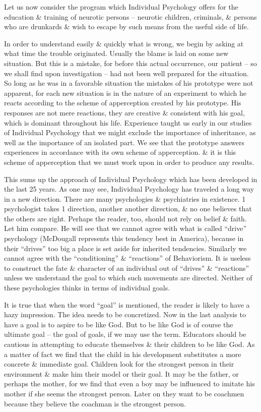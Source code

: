 \documentclass{article}
\begin{document}
Let us now consider the program which Individual Psychology offers for the education \& training of neurotic persons -- neurotic children, criminals, \& persons who are drunkards \& wish to escape by such means from the useful side of life.

In order to understand easily \& quickly what is wrong, we begin by asking at what time the trouble originated. Usually the blame is laid on some new situation. But this is a mistake, for before this actual occurrence, our patient -- so we shall find upon investigation -- had not been well prepared for the situation. So long as he was in a favorable situation the mistakes of his prototype were not apparent, for each new situation is in the nature of an experiment to which he reacts according to the scheme of apperception created by his prototype. His responses are not mere reactions, they are creative \& consistent with his goal, which is dominant throughout his life. Experience taught us early in our studies of Individual Psychology that we might exclude the importance of inheritance, as well as the importance of an isolated part. We see that the prototype answers experiences in accordance with its own scheme of apperception. \& it is this scheme of apperception that we must work upon in order to produce any results.

This sums up the approach of Individual Psychology which has been developed in the last 25 years. As one may see, Individual Psychology has traveled a long way in a new direction. There are many psychologies \& psychiatries in existence. 1 psychologist takes 1 direction, another another direction, \& no one believes that the others are right. Perhaps the reader, too, should not rely on belief \& faith. Let him compare. He will see that we cannot agree with what is called ``drive'' psychology (McDougall represents this tendency best in America), because in their ``drives'' too big a place is set aside for inherited tendencies. Similarly we cannot agree with the ``conditioning'' \& ``reactions'' of Behaviorism. It is useless to construct the fate \& character of an individual out of ``drives'' \& ``reactions'' unless we understand the goal to which such movements are directed. Neither of these psychologies thinks in terms of individual goals.

It is true that when the word ``goal'' is mentioned, the reader is likely to have a hazy impression. The idea needs to be concretized. Now in the last analysis to have a goal is to aspire to be like God. But to be like God is of course the ultimate goal -- the goal of goals, if we may use the term. Educators should be cautious in attempting to educate themselves \& their children to be like God. As a matter of fact we find that the child in his development substitutes a more concrete \& immediate goal. Children look for the strongest person in their environment \& make him their model or their goal. It may be the father, or perhaps the mother, for we find that even a boy may be influenced to imitate his mother if she seems the strongest person. Later on they want to be coachmen because they believe the coachman is the strongest person.
\end{document}
